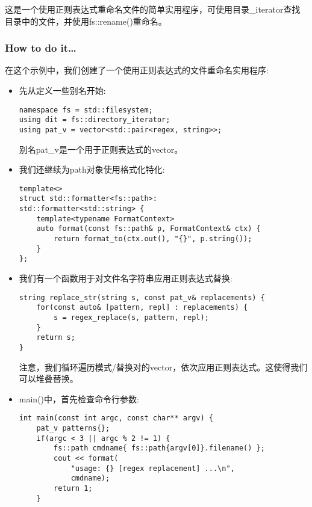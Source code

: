 

这是一个使用正则表达式重命名文件的简单实用程序，可使用目录\_iterator查找目录中的文件，并使用fs::rename()重命名。

\subsubsection{How to do it…}

在这个示例中，我们创建了一个使用正则表达式的文件重命名实用程序:

\begin{itemize}
\item 
先从定义一些别名开始:

\begin{lstlisting}[style=styleCXX]
namespace fs = std::filesystem;
using dit = fs::directory_iterator;
using pat_v = vector<std::pair<regex, string>>;
\end{lstlisting}

别名pat\_v是一个用于正则表达式的vector。

\item 
我们还继续为path对象使用格式化特化:

\begin{lstlisting}[style=styleCXX]
template<>
struct std::formatter<fs::path>:
std::formatter<std::string> {
	template<typename FormatContext>
	auto format(const fs::path& p, FormatContext& ctx) {
		return format_to(ctx.out(), "{}", p.string());
	}
};
\end{lstlisting}

\item 
我们有一个函数用于对文件名字符串应用正则表达式替换:

\begin{lstlisting}[style=styleCXX]
string replace_str(string s, const pat_v& replacements) {
	for(const auto& [pattern, repl] : replacements) {
		s = regex_replace(s, pattern, repl);
	}
	return s;
}
\end{lstlisting}

注意，我们循环遍历模式/替换对的vector，依次应用正则表达式。这使得我们可以堆叠替换。

\item 
main()中，首先检查命令行参数:

\begin{lstlisting}[style=styleCXX]
int main(const int argc, const char** argv) {
	pat_v patterns{};
	if(argc < 3 || argc % 2 != 1) {
		fs::path cmdname{ fs::path{argv[0]}.filename() };
		cout << format(
			"usage: {} [regex replacement] ...\n",
			cmdname);
		return 1;
	}
\end{lstlisting}


\end{itemize}
